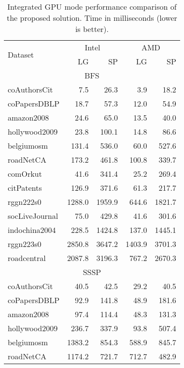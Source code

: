\begin{table}[tbp]
\caption{Integrated GPU mode performance comparison of the proposed solution. Time in milliseconds (lower is better).} 
\begin{center}
    \begin{tabular}{|l|r|r|r|r|}
    \hline
    \multirow{2}{*}{Dataset} & \multicolumn{2}{c|}{Intel} & \multicolumn{2}{c|}{AMD} \\
    \cline{2-5}
    & LG & SP & LG & SP \\
    \hline
    \hline
    \multicolumn{5}{|c|}{BFS} \\
    \hline
    \rowcolor{black!10} coAuthorsCit&7.5&26.3&3.9&18.2\\
    \rowcolor{black!2 } coPapersDBLP&18.7&57.3&12.0&54.9\\
    \rowcolor{black!10} amazon2008&24.6&65.0&13.5&40.0\\
    \rowcolor{black!2 } hollywood2009&23.8&100.1&14.8&86.6\\
    \rowcolor{black!10} belgiumosm&131.4&536.0&60.0&527.6\\
    \rowcolor{black!2 } roadNetCA&173.2&461.8&100.8&339.7\\
    \rowcolor{black!10} comOrkut&41.6&341.4&25.2&269.4\\
    \rowcolor{black!2 } citPatents&126.9&371.6&61.3&217.7\\
    \rowcolor{black!10} rggn222s0&1288.0&1959.9&644.6&1821.7\\
    \rowcolor{black!2 } socLiveJournal&75.0&429.8&41.6&301.6\\
    \rowcolor{black!10} indochina2004&228.5&1424.8&137.0&1445.1\\
    \rowcolor{black!2 } rggn223s0&2850.8&3647.2&1403.9&3701.3\\
    \rowcolor{black!10} roadcentral&2087.8&3196.3&767.2&2670.3\\
    \hline
    \hline
    \multicolumn{5}{|c|}{SSSP} \\
    \hline
    \rowcolor{black!10} coAuthorsCit&40.5&42.5&29.2&40.5\\
    \rowcolor{black!2 } coPapersDBLP&92.9&141.8&48.9&181.6\\
    \rowcolor{black!10} amazon2008&97.4&114.4&48.3&131.3\\
    \rowcolor{black!2 } hollywood2009&236.7&337.9&93.8&507.4\\
    \rowcolor{black!10} belgiumosm&1383.2&854.3&588.9&845.7\\
    \rowcolor{black!2 } roadNetCA&1174.2&721.7&712.7&482.9\\

\end{tabular}
\end{center}
\end{table}
